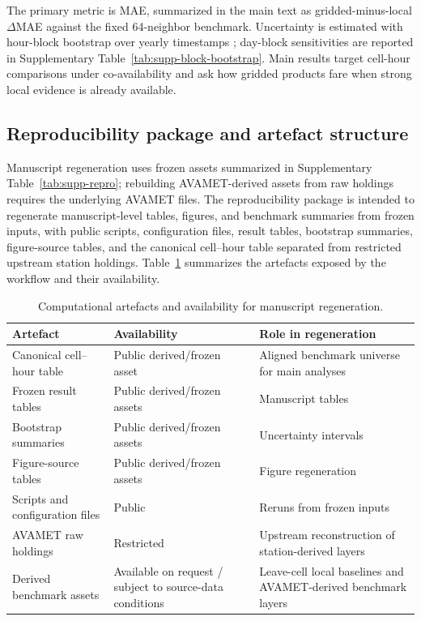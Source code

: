 \documentclass[preprint,12pt]{elsarticle}
\newcommand{\deltamae}{$\Delta$MAE}
\begin{document}
The primary metric is MAE, summarized in the main text as gridded-minus-local \deltamae{} against the fixed 64-neighbor benchmark. Uncertainty is estimated with hour-block bootstrap over yearly timestamps \citep{kunsch1989bootstrap}; day-block sensitivities are reported in Supplementary Table~\ref{tab:supp-block-bootstrap}. Main results target cell-hour comparisons under co-availability and ask how gridded products fare when strong local evidence is already available.

\subsection{Reproducibility package and artefact structure}

Manuscript regeneration uses frozen assets summarized in Supplementary Table~\ref{tab:supp-repro}; rebuilding AVAMET-derived assets from raw holdings requires the underlying AVAMET files. The reproducibility package is intended to regenerate manuscript-level tables, figures, and benchmark summaries from frozen inputs, with public scripts, configuration files, result tables, bootstrap summaries, figure-source tables, and the canonical cell--hour table separated from restricted upstream station holdings. Table~\ref{tab:computational-artefacts} summarizes the artefacts exposed by the workflow and their availability.

\begin{table}[t]
\centering
\begin{threeparttable}
\caption{Computational artefacts and availability for manuscript regeneration.}
\label{tab:computational-artefacts}
\footnotesize
\begin{tabularx}{\textwidth}{>{\raggedright\arraybackslash}p{4.0cm} >{\raggedright\arraybackslash}p{4.1cm} >{\raggedright\arraybackslash}X}
\toprule
Artefact & Availability & Role in regeneration \\
\midrule
Canonical cell--hour table & Public derived/frozen asset & Aligned benchmark universe for main analyses \\
Frozen result tables & Public derived/frozen assets & Manuscript tables \\
Bootstrap summaries & Public derived/frozen assets & Uncertainty intervals \\
Figure-source tables & Public derived/frozen assets & Figure regeneration \\
Scripts and configuration files & Public & Reruns from frozen inputs \\
AVAMET raw holdings & Restricted & Upstream reconstruction of station-derived layers \\
Derived benchmark assets & Available on request / subject to source-data conditions & Leave-cell local baselines and AVAMET-derived benchmark layers \\
\bottomrule
\end{tabularx}
\end{threeparttable}
\end{table}
\end{document}

